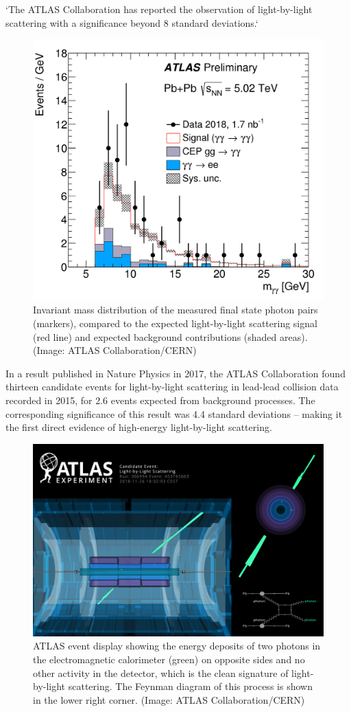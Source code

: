 \documentclass{article}
\begin{document}
`The ATLAS Collaboration has reported the observation of light-by-light scattering with a significance
beyond 8 standard deviations.`

\begin{figure}[ht]
	\centering
	\includegraphics[width=0.5\linewidth]{figures/LbyL-fig2.png}
	\caption{Invariant mass distribution of the measured final state photon pairs (markers), compared
		to the expected light-by-light scattering signal (red line) and expected background contributions
		(shaded areas). (Image: ATLAS Collaboration/CERN)}
	\label{fig:Atlas data}
\end{figure}

In a result published in Nature Physics in 2017, the ATLAS Collaboration found thirteen candidate events for light-by-light scattering in lead-lead collision data recorded in 2015, for 2.6 events expected from background processes. The corresponding significance of this result was 4.4 standard deviations – making it the first direct evidence of high-energy light-by-light scattering.

\begin{figure}[ht]
	\centering
	\includegraphics[width=0.5\linewidth]{figures/EventDisplay_LbyL.png}
	\caption{ATLAS event display showing the energy deposits of two photons in the electromagnetic
		calorimeter (green) on opposite sides and no other activity in the detector, which is the clean signature
		of light-by-light scattering. The Feynman diagram of this process is shown in the lower right corner.
		(Image: ATLAS Collaboration/CERN)}
	\label{fig:Atlas_event}
\end{figure}
\end{document}
